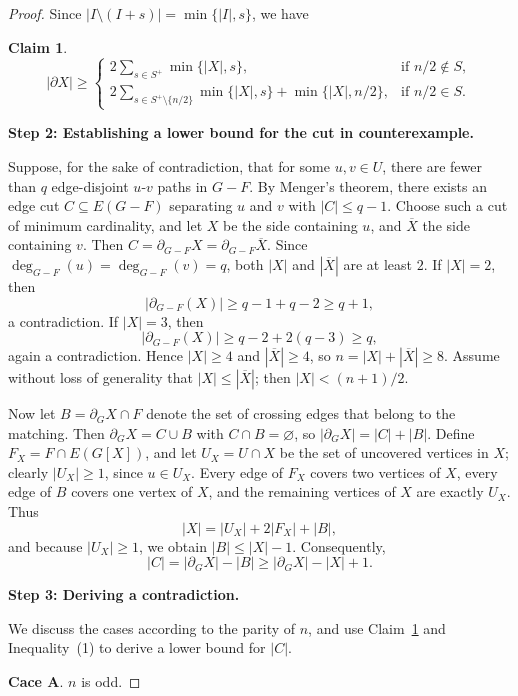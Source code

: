 \documentclass{article}
\newtheorem{claim}[theorem]{Claim}
\begin{document}
\begin{proof}
Since $\bigl|I \setminus (I+s)\bigr|=\min\{|I|,s\}$, we have  
\begin{claim}
\label{cl:stronger}
\[
|\partial X|\geq
\begin{cases}
2\sum\limits_{s\in S^+}\min\{|X|,s\}, & \text{if } n/2\notin S,\\[4pt]
2\sum\limits_{s\in S^+\setminus\{n/2\}}\min\{|X|,s\}+\min\{|X|,n/2\}, & \text{if } n/2\in S.
\end{cases}
\]
\end{claim}

\noindent\textbf{Step 2: Establishing a lower bound for the cut in counterexample.}

Suppose, for the sake of contradiction, that for some \(u,v\in U\), there are fewer than \(q\) edge-disjoint \(u\)-\(v\) paths in \(G-F\). By Menger's theorem, there exists an edge cut \(C\subseteq E(G-F)\) separating \(u\) and \(v\) with \(|C|\le q-1\). Choose such a cut of minimum cardinality, and let \(X\) be the side containing \(u\), and \(\overline{X}\) the side containing \(v\). Then \(C=\partial_{G-F}X=\partial_{G-F}\overline{X}\). Since \(\deg_{G-F}(u)=\deg_{G-F}(v)=q\), both \(|X|\) and \(|\overline{X}|\) are at least \(2\). If \(|X|=2\), then
\[
|\partial_{G-F}(X)|\ge q-1+q-2\ge q+1,
\]
a contradiction. If \(|X|=3\), then
\[
|\partial_{G-F}(X)|\ge q-2+2(q-3)\ge q,
\]
again a contradiction. Hence \(|X|\ge4\) and \(|\overline{X}|\ge4\), so \(n=|X|+|\overline{X}|\ge8\). Assume without loss of generality that \(|X|\le|\overline{X}|\); then \(|X|<(n+1)/2\).

Now let \(B=\partial_G X\cap F\) denote the set of crossing edges that belong to the matching. Then \(\partial_G X=C\cup B\) with \(C\cap B=\varnothing\), so \(|\partial_G X|=|C|+|B|\). Define \(F_X=F\cap E(G[X])\), and let \(U_X=U\cap X\) be the set of uncovered vertices in \(X\); clearly \(|U_X|\ge1\), since \(u\in U_X\). Every edge of \(F_X\) covers two vertices of \(X\), every edge of \(B\) covers one vertex of \(X\), and the remaining vertices of \(X\) are exactly \(U_X\). Thus
\[
|X|=|U_X|+2|F_X|+|B|,
\]
and because \(|U_X|\ge1\), we obtain \(|B|\le |X|-1\). Consequently,
\[
|C|=|\partial_G X|-|B|\ge |\partial_G X|-|X|+1. \tag{1}
\]

\noindent\textbf{Step 3: Deriving a contradiction.}

We discuss the cases according to the parity of \(n\), and use Claim~\ref{cl:stronger} and Inequality~(1) to derive a lower bound for \(|C|\).

{\bf Cace A}. $n$ is odd.


\end{proof}
\end{document}
